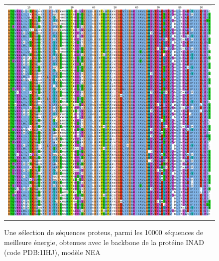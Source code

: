    \begin{figure}[t]
     \centering
     \begin{tabular}{c}
       \includegraphics[width=17cm]{proteus/1IHJ.png} \\
     \end{tabular}
       \caption{Une sélection de séquences proteus, parmi les 10000 séquences de meilleure énergie, obtenues avec le backbone de la protéine INAD (code PDB:1IHJ), modèle NEA}
\label{align_proteus:INAD}
   \end{figure}
\clearpage

